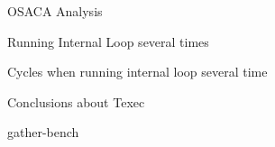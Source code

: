 \documentclass[aspectratio=43,t]{beamer}
\begin{document}
  \begin{frame}[fragile]{OSACA Analysis}
  \end{frame}

  \begin{frame}[fragile]{Running Internal Loop several times}
  \end{frame}

  \begin{frame}[fragile]{Cycles when running internal loop several time}
  \end{frame}

  \begin{frame}[fragile]{Conclusions about Texec}
  \end{frame}

  \begin{frame}[fragile]{gather-bench}
  \end{frame}




  { %

  }
\end{document}

